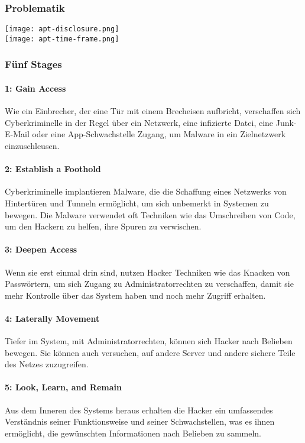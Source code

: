 \subsubsection{Problematik}
\texttt{[image: apt-disclosure.png]}\\
\texttt{[image: apt-time-frame.png]}

\subsubsection{Fünf Stages}
\paragraph{1: Gain Access}
Wie ein Einbrecher, der eine Tür mit einem Brecheisen aufbricht, verschaffen sich Cyberkriminelle in der Regel über ein Netzwerk, eine infizierte Datei, eine Junk-E-Mail oder eine App-Schwachstelle Zugang, um Malware in ein Zielnetzwerk einzuschleusen.

\paragraph{2: Establish a Foothold}
Cyberkriminelle implantieren Malware, die die Schaffung eines Netzwerks von Hintertüren und Tunneln ermöglicht, um sich unbemerkt in Systemen zu bewegen. Die Malware verwendet oft Techniken wie das Umschreiben von Code, um den Hackern zu helfen, ihre Spuren zu verwischen.

\paragraph{3: Deepen Access}
Wenn sie erst einmal drin sind, nutzen Hacker Techniken wie das Knacken von Passwörtern, um sich Zugang zu Administratorrechten zu verschaffen, damit sie mehr Kontrolle über das System haben und noch mehr Zugriff erhalten.

\paragraph{4: Laterally Movement}
Tiefer im System, mit Administratorrechten, können sich Hacker nach Belieben bewegen. 
Sie können auch versuchen, auf andere Server und andere sichere Teile des Netzes zuzugreifen.

\paragraph{5: Look, Learn, and Remain}
Aus dem Inneren des Systems heraus erhalten die Hacker ein umfassendes Verständnis seiner Funktionsweise und seiner Schwachstellen, was es ihnen ermöglicht, die gewünschten Informationen nach Belieben zu sammeln.

